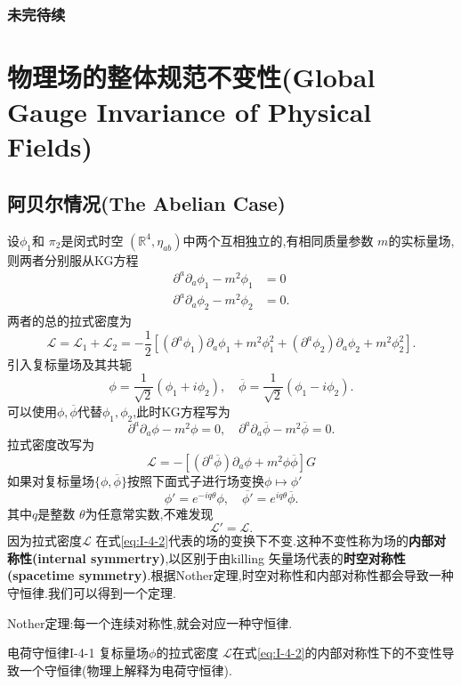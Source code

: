 \documentclass[../main.tex]{subfiles}
\begin{document}
 \subsection{未完待续}
 \chapter{物理场的整体规范不变性(Global Gauge Invariance of Physical Fields)}
 \section{阿贝尔情况(The Abelian Case)}
 设$\phi_1$和 $\pi_2$是闵式时空 $(\mathbb{R}^4,\eta_{ab})$中两个互相独立的,有相同质量参数 $m$的实标量场,则两者分别服从KG方程
 \begin{align*}
 \partial^a\partial_a \phi_1 - m^2 \phi_1 &= 0 \\
 \partial^a\partial_a \phi_2 - m^2\phi_2 & = 0
 .\end{align*}
 两者的总的拉式密度为\[
 \mathscr{L} = \mathscr{L}_1 + \mathscr{L}_2 = -\frac{1}{2}[(\partial^a\phi_1)\partial_a \phi_1 + m^2 \phi_1^2+(\partial^a\phi_2)\partial_a \phi_2 + m^2 \phi_2^2]
 .\] 
 引入复标量场及其共轭\[
 \phi = \frac{1}{\sqrt{2}}(\phi_1 + i\phi_2),\quad \overline{\phi} = \frac{1}{\sqrt{2} }(\phi_1- i\phi_2)
 .\] 
 可以使用$\phi,\overline{\phi}$代替$\phi_1,\phi_2$,此时KG方程写为 \[
 \partial^a\partial_a \phi - m^2 \phi = 0,\quad \partial^a\partial_a \overline{\phi} - m^2 \overline{\phi} =0
 .\] 
 拉式密度改写为
 \begin{equation}
 \mathscr{L} = -[(\partial^a \overline{\phi})\partial_a \phi + m^2\phi \overline{\phi}]G
 \label{eq:I-4-1}
 \end{equation}
 如果对复标量场$\{\phi,\overline{\phi}\}$按照下面式子进行场变换$\phi \mapsto \phi'$
 \begin{equation}
 \label{eq:I-4-2}
 \phi' = e^{-iq\theta}\phi, \quad \overline{\phi'} = e^{iq\theta}\overline{\phi}
 . \end{equation}
 其中$q$是整数 $\theta$为任意常实数,不难发现 \[
 \mathscr{L}' = \mathscr{L}
 .\]
 因为拉式密度$\mathscr{L}$ 在式\ref{eq:I-4-2}代表的场的变换下不变.这种不变性称为场的\textbf{内部对称性(internal symmertry)},以区别于由killing
 矢量场代表的\textbf{时空对称性(spacetime symmetry)}.根据Nother定理,时空对称性和内部对称性都会导致一种守恒律.我们可以得到一个定理.
 \begin{note}
Nother定理:每一个连续对称性,就会对应一种守恒律. 
 \end{note}
 \begin{theorem}
 {电荷守恒律}{I-4-1}
 复标量场$\phi$的拉式密度 $\mathscr{L}$在式\ref{eq:I-4-2}的内部对称性下的不变性导致一个守恒律(物理上解释为电荷守恒律).
 \end{theorem}
\end{document}
